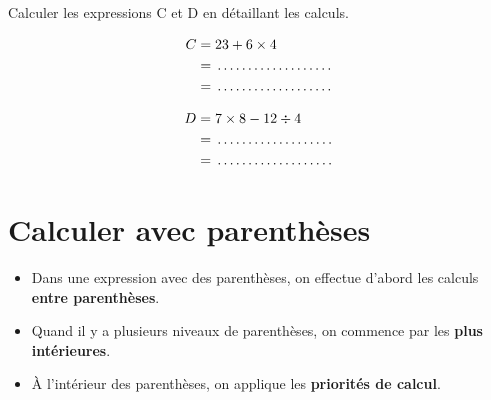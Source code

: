 \begin{examplebox}
Calculer les expressions C et D en détaillant les calculs.

\begin{minipage}[t]{0.48\textwidth}
\begin{align*}
C &= 23 + 6 \times 4 \\
&= \trous{3cm} \\
&= \trous{3cm}
\end{align*}
\end{minipage}
\begin{minipage}[t]{0.48\textwidth}
\begin{align*}
D &= 7 \times 8 - 12 \div 4 \\
&= \trous{3cm} \\
&= \trous{3cm}
\end{align*}
\end{minipage}
\end{examplebox}

\section{Calculer avec parenthèses}

\begin{proprietebox}
\begin{itemize}[label = \textbullet]
\item Dans une expression avec des parenthèses, on effectue d'abord les calculs \textbf{entre parenthèses}.
\item Quand il y a plusieurs niveaux de parenthèses, on commence par les \textbf{plus intérieures}.
\item À l'intérieur des parenthèses, on applique les \textbf{priorités de calcul}.
\end{itemize}
\end{proprietebox}

